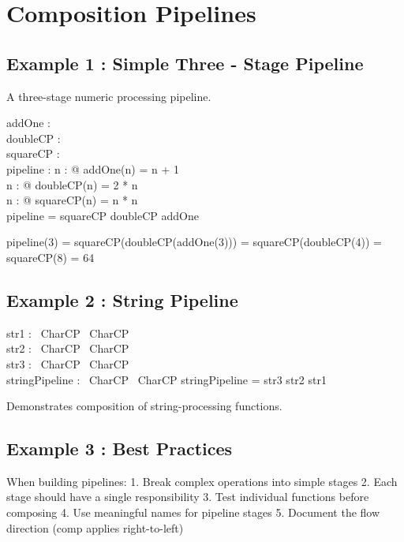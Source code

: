 \documentclass[a4paper,10pt,fleqn]{article}
\begin{document}
\section*{Composition Pipelines}

\subsection*{Example 1 : Simple Three - Stage Pipeline}

\noindent A three-stage numeric processing pipeline.

\bigskip

\begin{axdef}
addOne : \nat \fun \nat \\
doubleCP : \nat \fun \nat \\
squareCP : \nat \fun \nat \\
pipeline : \nat \fun \nat
\where
\forall n : \nat @ addOne(n) = n + 1 \\
\forall n : \nat @ doubleCP(n) = 2 * n \\
\forall n : \nat @ squareCP(n) = n * n \\
pipeline = squareCP \comp doubleCP \comp addOne
\end{axdef}

\noindent pipeline(3) = squareCP(doubleCP(addOne(3))) = squareCP(doubleCP(4)) = squareCP(8) = 64

\bigskip

\subsection*{Example 2 : String Pipeline}

\begin{zed}
[CharCP]
\end{zed}

\begin{axdef}
str1 : \seq~CharCP \fun \seq~CharCP \\
str2 : \seq~CharCP \fun \seq~CharCP \\
str3 : \seq~CharCP \fun \seq~CharCP \\
stringPipeline : \seq~CharCP \fun \seq~CharCP
\where
stringPipeline = str3 \comp str2 \comp str1
\end{axdef}

\noindent Demonstrates composition of string-processing functions.

\bigskip

\subsection*{Example 3 : Best Practices}

\noindent When building pipelines: 1. Break complex operations into simple stages 2. Each stage should have a single responsibility 3. Test individual functions before composing 4. Use meaningful names for pipeline stages 5. Document the flow direction (comp applies right-to-left)

\bigskip
\end{document}
